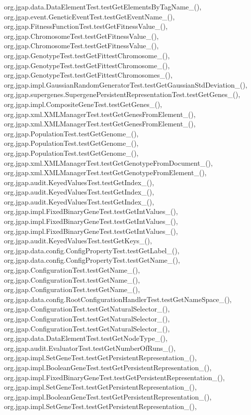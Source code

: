 org.\-jgap.\-data.\-Data\-Element\-Test.\-test\-Get\-Elements\-By\-Tag\-Name\-\_(), org.\-jgap.\-event.\-Genetic\-Event\-Test.\-test\-Get\-Event\-Name\-\_(), org.\-jgap.\-Fitness\-Function\-Test.\-test\-Get\-Fitness\-Value\-\_(), org.\-jgap.\-Chromosome\-Test.\-test\-Get\-Fitness\-Value\-\_(), org.\-jgap.\-Chromosome\-Test.\-test\-Get\-Fitness\-Value\-\_(), org.\-jgap.\-Genotype\-Test.\-test\-Get\-Fittest\-Chromosome\-\_(), org.\-jgap.\-Genotype\-Test.\-test\-Get\-Fittest\-Chromosome\-\_(), org.\-jgap.\-Genotype\-Test.\-test\-Get\-Fittest\-Chromosomes\-\_(), org.\-jgap.\-impl.\-Gaussian\-Random\-Generator\-Test.\-test\-Get\-Gaussian\-Std\-Deviation\-\_(), org.\-jgap.\-supergenes.\-Supergene\-Persistent\-Representation\-Test.\-test\-Get\-Genes\-\_(), org.\-jgap.\-impl.\-Composite\-Gene\-Test.\-test\-Get\-Genes\-\_(), org.\-jgap.\-xml.\-X\-M\-L\-Manager\-Test.\-test\-Get\-Genes\-From\-Element\-\_(), org.\-jgap.\-xml.\-X\-M\-L\-Manager\-Test.\-test\-Get\-Genes\-From\-Element\-\_(), org.\-jgap.\-Population\-Test.\-test\-Get\-Genome\-\_(), org.\-jgap.\-Population\-Test.\-test\-Get\-Genome\-\_(), org.\-jgap.\-Population\-Test.\-test\-Get\-Genome\-\_(), org.\-jgap.\-xml.\-X\-M\-L\-Manager\-Test.\-test\-Get\-Genotype\-From\-Document\-\_(), org.\-jgap.\-xml.\-X\-M\-L\-Manager\-Test.\-test\-Get\-Genotype\-From\-Element\-\_(), org.\-jgap.\-audit.\-Keyed\-Values\-Test.\-test\-Get\-Index\-\_(), org.\-jgap.\-audit.\-Keyed\-Values\-Test.\-test\-Get\-Index\-\_(), org.\-jgap.\-audit.\-Keyed\-Values\-Test.\-test\-Get\-Index\-\_(), org.\-jgap.\-impl.\-Fixed\-Binary\-Gene\-Test.\-test\-Get\-Int\-Values\-\_(), org.\-jgap.\-impl.\-Fixed\-Binary\-Gene\-Test.\-test\-Get\-Int\-Values\-\_(), org.\-jgap.\-impl.\-Fixed\-Binary\-Gene\-Test.\-test\-Get\-Int\-Values\-\_(), org.\-jgap.\-audit.\-Keyed\-Values\-Test.\-test\-Get\-Keys\-\_(), org.\-jgap.\-data.\-config.\-Config\-Property\-Test.\-test\-Get\-Label\-\_(), org.\-jgap.\-data.\-config.\-Config\-Property\-Test.\-test\-Get\-Name\-\_(), org.\-jgap.\-Configuration\-Test.\-test\-Get\-Name\-\_(), org.\-jgap.\-Configuration\-Test.\-test\-Get\-Name\-\_(), org.\-jgap.\-Configuration\-Test.\-test\-Get\-Name\-\_(), org.\-jgap.\-data.\-config.\-Root\-Configuration\-Handler\-Test.\-test\-Get\-Name\-Space\-\_(), org.\-jgap.\-Configuration\-Test.\-test\-Get\-Natural\-Selector\-\_(), org.\-jgap.\-Configuration\-Test.\-test\-Get\-Natural\-Selector\-\_(), org.\-jgap.\-Configuration\-Test.\-test\-Get\-Natural\-Selector\-\_(), org.\-jgap.\-data.\-Data\-Element\-Test.\-test\-Get\-Node\-Type\-\_(), org.\-jgap.\-audit.\-Evaluator\-Test.\-test\-Get\-Number\-Of\-Runs\-\_(), org.\-jgap.\-impl.\-Set\-Gene\-Test.\-test\-Get\-Persistent\-Representation\-\_(), org.\-jgap.\-impl.\-Boolean\-Gene\-Test.\-test\-Get\-Persistent\-Representation\-\_(), org.\-jgap.\-impl.\-Fixed\-Binary\-Gene\-Test.\-test\-Get\-Persistent\-Representation\-\_(), org.\-jgap.\-impl.\-Set\-Gene\-Test.\-test\-Get\-Persistent\-Representation\-\_(), org.\-jgap.\-impl.\-Boolean\-Gene\-Test.\-test\-Get\-Persistent\-Representation\-\_(), org.\-jgap.\-impl.\-Set\-Gene\-Test.\-test\-Get\-Persistent\-Representation\-\_(), 